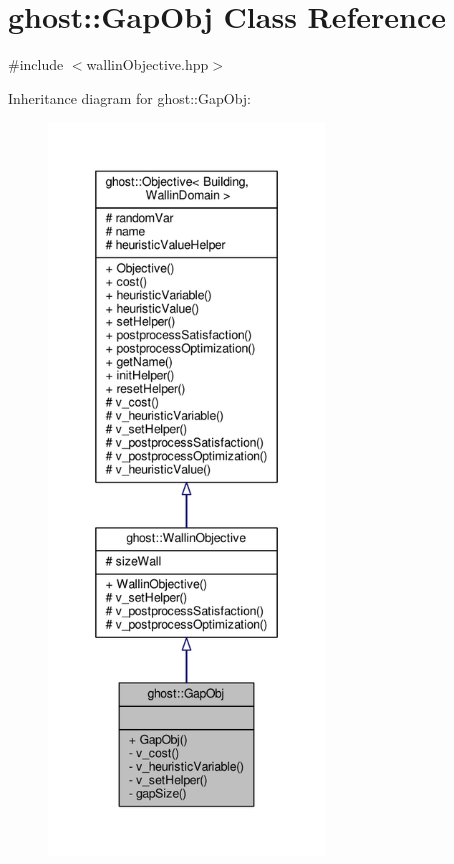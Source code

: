 \hypertarget{classghost_1_1GapObj}{\section{ghost\-:\-:Gap\-Obj Class Reference}
\label{classghost_1_1GapObj}
}


{\ttfamily \#include $<$wallin\-Objective.\-hpp$>$}



Inheritance diagram for ghost\-:\-:Gap\-Obj\-:
\nopagebreak
\begin{figure}[H]
\begin{center}
\leavevmode
\includegraphics[height=550pt]{classghost_1_1GapObj__inherit__graph}
\end{center}
\end{figure}


